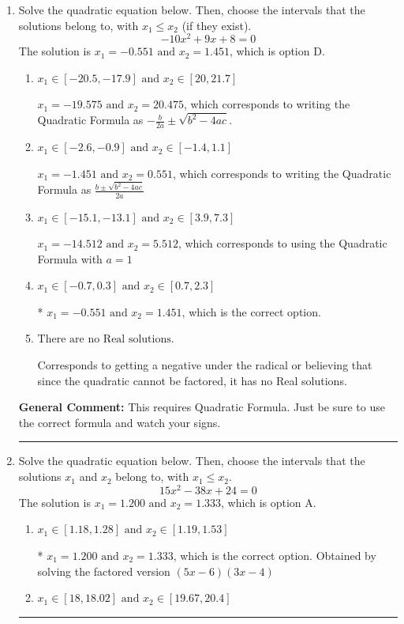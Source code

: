 \documentclass{extbook}[14pt]
\newcommand{\litem}[1]{\item #1

\rule{\textwidth}{0.4pt}}
\begin{document}
\begin{enumerate}\litem{
Solve the quadratic equation below. Then, choose the intervals that the solutions belong to, with $x_1 \leq x_2$ (if they exist).
\[ -10x^{2} +9 x + 8 = 0 \]The solution is \( x_1 = -0.551 \text{ and } x_2 = 1.451 \), which is option D.\begin{enumerate}[label=\Alph*.]
\item \( x_1 \in [-20.5, -17.9] \text{ and } x_2 \in [20, 21.7] \)

 $x_1 = -19.575 \text{ and } x_2 = 20.475$, which corresponds to writing the Quadratic Formula as $-\frac{b}{2a} \pm \sqrt{b^2 - 4ac}$.
\item \( x_1 \in [-2.6, -0.9] \text{ and } x_2 \in [-1.4, 1.1] \)

 $x_1 = -1.451 \text{ and } x_2 = 0.551$, which corresponds to writing the Quadratic Formula as $\frac{b \pm \sqrt{b^2 - 4ac}}{2a}$
\item \( x_1 \in [-15.1, -13.1] \text{ and } x_2 \in [3.9, 7.3] \)

 $x_1 = -14.512 \text{ and } x_2 = 5.512$, which corresponds to using the Quadratic Formula with $a=1$
\item \( x_1 \in [-0.7, 0.3] \text{ and } x_2 \in [0.7, 2.3] \)

* $x_1 = -0.551 \text{ and } x_2 = 1.451$, which is the correct option.
\item \( \text{There are no Real solutions.} \)

Corresponds to getting a negative under the radical or believing that since the quadratic cannot be factored, it has no Real solutions.
\end{enumerate}

\textbf{General Comment:} This requires Quadratic Formula. Just be sure to use the correct formula and watch your signs.
}
\litem{
Solve the quadratic equation below. Then, choose the intervals that the solutions $x_1$ and $x_2$ belong to, with $x_1 \leq x_2$.
\[ 15x^{2} -38 x + 24 = 0 \]The solution is \( x_1 = 1.200 \text{ and } x_2 = 1.333 \), which is option A.\begin{enumerate}[label=\Alph*.]
\item \( x_1 \in [1.18, 1.28] \text{ and } x_2 \in [1.19, 1.53] \)

* $x_1 = 1.200 \text{ and } x_2 = 1.333$, which is the correct option. Obtained by solving the factored version $(5x -6)(3x -4)$
\item \( x_1 \in [18, 18.02] \text{ and } x_2 \in [19.67, 20.4] \)


\end{enumerate}}
\end{enumerate}
\end{document}
